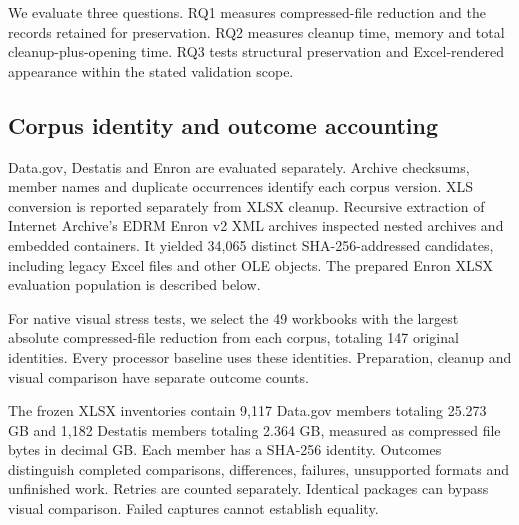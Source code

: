 We evaluate three questions. RQ1 measures compressed-file reduction and the records
retained for preservation. RQ2 measures cleanup time, memory and total
cleanup-plus-opening time. RQ3 tests structural preservation and Excel-rendered
appearance within the stated validation scope.

\subsection{Corpus identity and outcome accounting}
Data.gov, Destatis and Enron are evaluated separately. Archive checksums, member
names and duplicate occurrences identify each corpus version. XLS conversion is
reported separately from XLSX cleanup. Recursive extraction of Internet Archive's
EDRM Enron v2 XML archives inspected nested archives and embedded containers. It
yielded 34,065 distinct SHA-256-addressed candidates, including legacy Excel files
and other OLE objects. The prepared Enron XLSX evaluation population is described
below.

For native visual stress tests, we select the 49 workbooks with the largest
absolute compressed-file reduction from each corpus, totaling 147 original
identities. Every processor baseline uses these identities. Preparation, cleanup
and visual comparison have separate outcome counts.

The frozen XLSX inventories contain 9,117 Data.gov members totaling 25.273 GB and
1,182 Destatis members totaling 2.364 GB, measured as compressed file bytes in
decimal GB. Each member has a SHA-256 identity. Outcomes distinguish completed
comparisons, differences, failures, unsupported formats and unfinished work.
Retries are counted separately. Identical packages can bypass visual comparison.
Failed captures cannot establish equality.

